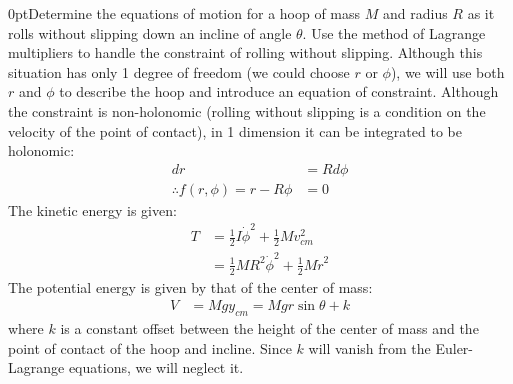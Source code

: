 \begin{example}{0pt}{Determine the equations of motion for a hoop of mass $M$ and radius $R$ as it rolls without slipping down an incline of angle $\theta$. Use the method of Lagrange multipliers to handle the constraint of rolling without slipping.}{}
Although this situation has only 1 degree of freedom (we could choose $r$ or $\phi$), we will use both $r$ and $\phi$ to describe the hoop and introduce an equation of constraint. Although the constraint is non-holonomic (rolling without slipping is a condition on the velocity of the point of contact), in 1 dimension it can be integrated to be holonomic:
\begin{align*}
dr&=Rd\phi\\
\therefore f(r,\phi)=r-R\phi &=0
\end{align*}
The kinetic energy is given:
\begin{align*}
T&=\frac{1}{2}I\dot{\phi}^2+\frac{1}{2}Mv_{cm}^2\\
&=\frac{1}{2}MR^2\dot{\phi}^2+\frac{1}{2}M\dot{r}^2
\end{align*}
The potential energy is given by that of the center of mass:
\begin{align*}
V&=Mgy_{cm}=Mgr\sin{\theta}+k
\end{align*}
where $k$ is a constant offset between the height of the center of mass and the point of contact of the hoop and incline. Since $k$ will vanish from the Euler-Lagrange equations, we will neglect it.


\end{example}
